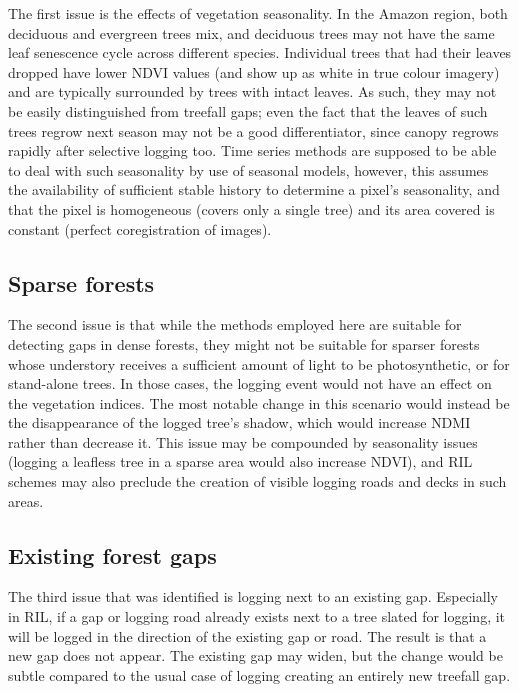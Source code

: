 \documentclass[a4paper,12pt]{scrbook}
\begin{document}

The first issue is the effects of vegetation seasonality. In the Amazon region, both deciduous and evergreen trees mix, and deciduous trees may not have the same leaf senescence cycle across different species. Individual trees that had their leaves dropped have lower \ac{NDVI} values (and show up as white in true colour imagery) and are typically surrounded by trees with intact leaves. As such, they may not be easily distinguished from treefall gaps; even the fact that the leaves of such trees regrow next season may not be a good differentiator, since canopy regrows rapidly after selective logging too. Time series methods are supposed to be able to deal with such seasonality by use of seasonal models, however, this assumes the availability of sufficient stable history to determine a pixel's seasonality, and that the pixel is homogeneous (covers only a single tree) and its area covered is constant (perfect coregistration of images).

\subsection{Sparse forests}

The second issue is that while the methods employed here are suitable for detecting gaps in dense forests, they might not be suitable for sparser forests whose understory receives a sufficient amount of light to be photosynthetic, or for stand-alone trees. In those cases, the logging event would not have an effect on the vegetation indices. The most notable change in this scenario would instead be the disappearance of the logged tree's shadow, which would increase \ac{NDMI} rather than decrease it. This issue may be compounded by seasonality issues (logging a leafless tree in a sparse area would also increase \ac{NDVI}), and \ac{RIL} schemes may also preclude the creation of visible logging roads and decks in such areas.

\subsection{Existing forest gaps}

The third issue that was identified is logging next to an existing gap. Especially in \ac{RIL}, if a gap or logging road already exists next to a tree slated for logging, it will be logged in the direction of the existing gap or road. The result is that a new gap does not appear. The existing gap may widen, but the change would be subtle compared to the usual case of logging creating an entirely new treefall gap.
\end{document}
